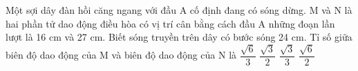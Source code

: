 \begin{vidu}%
 Một sợi dây đàn hồi căng ngang với đầu A cố định đang có sóng dừng. M và N là hai phần tử dao động điều hòa có vị trí cân bằng cách đầu A những đoạn lần lượt là 16 cm và 27 cm. Biết sóng truyền trên dây có bước sóng 24 cm. Tỉ số giữa biên độ dao động của M và biên độ dao động của N là
\choice
{$\dfrac{\sqrt{6}}{3}$}
{$\dfrac{\sqrt{3}}{2}$}
{$\dfrac{\sqrt{3}}{3}$}
{\True $\dfrac{\sqrt{6}}{2}$}
\end{vidu} %

